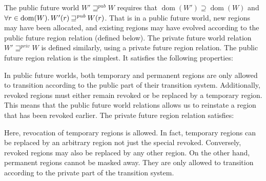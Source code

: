 \documentclass[format=acmsmall, review=true, screen=true]{acmart}
\DeclareMathOperator{\dom}{dom}
\newcommand\lau[1]{{\color{purple} \sf \footnotesize {LS: #1}}\\}
\newcommand\dominique[1]{{\color{purple} \sf \footnotesize {DD: #1}}\\}
\renewcommand\lau[1]{}
\renewcommand\dominique[1]{}
\newcommand{\var}[1]{\mathit{#1}}
\newcommand{\pub}{\var{pub}}
\newcommand{\futurewk}{\mathbin{\sqsupseteq}^{\var{pub}}}
\newcommand{\futurestr}{\mathbin{\sqsupseteq}^{\var{priv}}}
\newcommand{\plaindom}[1]{\mathrm{#1}}
\newcommand{\Regions}{\plaindom{Region}}
\newcommand{\plainview}[1]{\mathrm{#1}}
\newcommand{\temp}{\plainview{temp}}
\newcommand{\revoked}{\plainview{revoked}}
\begin{document}
The public future world $W' \futurewk W$ requires that $\dom(W') \supseteq \dom(W)$ and $\forall r \in \dom(W) \ldotp W'(r) \futurewk W(r)$.
That is in a public future world, new regions may have been allocated, and existing regions may have evolved according to the public future region relation (defined below).
The private future world relation $W' \futurestr W$ is defined similarly, using a private future region relation.
The public future region relation is the simplest.
It satisfies
the following properties:
In public future worlds, both temporary and permanent regions are only allowed to transition according to the public part of their transition system.
Additionally, revoked regions must either remain revoked or be replaced by a temporary region.
This means that the public future world relations allows us to reinstate a region that has been revoked earlier.
The private future region relation satisfies:
Here, revocation of temporary regions is allowed.
In fact, temporary regions can be replaced by an arbitrary region not just the special $\revoked$.
Conversely, $\revoked$ regions may also be replaced by any other region.
On the other hand, permanent regions cannot be masked away.
They are only allowed to transition according to the private part of the transition system.
\end{document}

